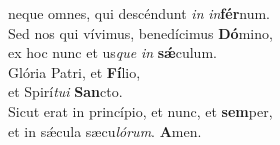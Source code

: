 \evenverse neque omnes, qui descéndunt \textit{in} \textit{in}\textbf{fér}num.\\
\oddverse Sed nos qui vívimus, benedícimus \textbf{Dó}mino,~\*\\
\oddverse ex hoc nunc et us\textit{que} \textit{in} \textbf{sǽ}culum.\\
\evenverse Glória Patri, et \textbf{Fí}lio,~\*\\
\evenverse et Spirí\textit{tu}\textit{i} \textbf{San}cto.\\
\oddverse Sicut erat in princípio, et nunc, et \textbf{sem}per,~\*\\
\oddverse et in sǽcula sæcu\textit{ló}\textit{rum}. \textbf{A}men.\\

